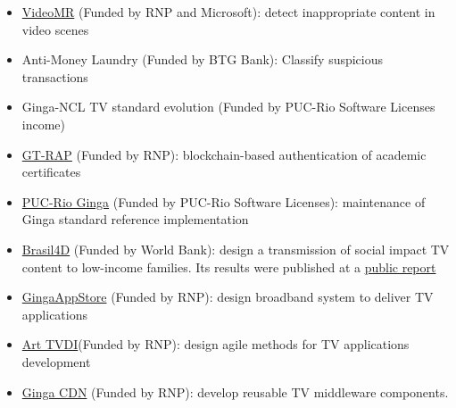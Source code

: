 \documentclass[10pt,a4paper,sans,colorlinks]{moderncv}
\begin{document}
  \begin{itemize}[mynosep]
    \item \href{https://www.rnp.br/en/rnp-and-microsoft-challenge-artificial-intelligence}{VideoMR} (Funded by RNP and Microsoft): detect inappropriate content in video scenes
    \item Anti-Money Laundry (Funded by BTG Bank): Classify suspicious transactions
    \item Ginga-NCL TV standard evolution (Funded by PUC-Rio Software Licenses income)
    \item \href{http://wrnp.rnp.br/sites/wrnp2017/files/02_wrnp2017_poster_gt-sap_design.pdf}{GT-RAP} (Funded by RNP): blockchain-based authentication of academic certificates
  \end{itemize}

  \begin{itemize}[mynosep]
    \item\href{{https://github.com/TeleMidia/ginga}}{PUC-Rio Ginga} (Funded by PUC-Rio Software Licenses): maintenance of Ginga \newline standard reference implementation
  \end{itemize}

  \begin{itemize}[mynosep]
    \item \href{http://www.ebc.com.br/brasil-4d}{Brasil4D} (Funded by World Bank): design a transmission of social impact TV content to low-income families. Its results were published at a \href{http://documents.worldbank.org/curated/en/232621468230956108/pdf/809560WP0PORTU0Box0379824B00PUBLIC0.pdf}{public report}
  \end{itemize}

  \begin{itemize}[mynosep]
    \item \href{http://www.redetic.rnp.br/ctic/2019/01/29/ginga-appstore/}{GingaAppStore}  (Funded by RNP): design broadband system to deliver TV applications
    \item \href{http://www.redetic.rnp.br/ctic/2019/01/29/arttvdi/}{Art TVDI}(Funded by RNP): design agile methods for TV applications development
    \item \href{http://www.redetic.rnp.br/ctic/2019/01/29/gingarap-gingafrevo/}{Ginga CDN} (Funded by RNP): develop reusable TV middleware components.
  \end{itemize}
\end{document}
